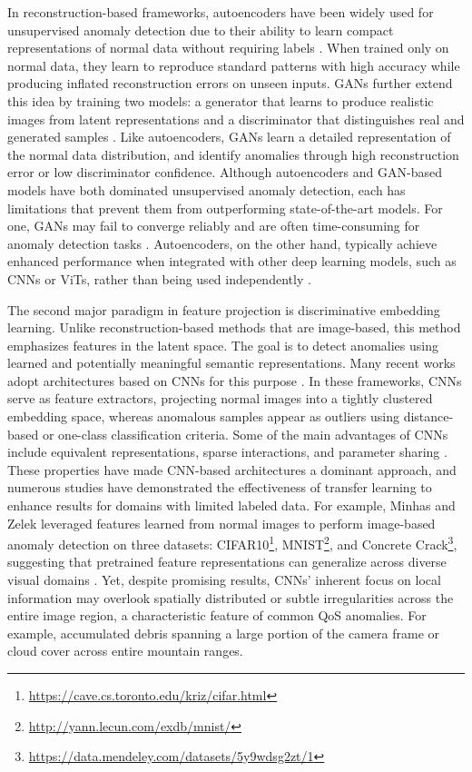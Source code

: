 \documentclass{article}
\begin{document}
In reconstruction-based frameworks, autoencoders have been widely used for unsupervised anomaly detection due to their ability to learn compact representations of normal data without requiring labels \cite{cheng2021improved, sakurada2014anomaly, ustek2024deep}. When trained only on normal data, they learn to reproduce standard patterns with high accuracy while producing inflated reconstruction errors on unseen inputs. \Ac{GANs} further extend this idea by training two models: a generator that learns to produce realistic images from latent representations and a discriminator that distinguishes real and generated samples \cite{Walczyna2025, xia2022gan}. Like autoencoders, \ac{GANs} learn a detailed representation of the normal data distribution, and identify anomalies through high reconstruction error or low discriminator confidence. Although autoencoders and GAN-based models have both dominated unsupervised anomaly detection, each has limitations that prevent them from outperforming state-of-the-art models. For one, \ac{GANs} may fail to converge reliably and are often time-consuming for anomaly detection tasks \cite{chen2022effectively}. Autoencoders, on the other hand, typically achieve enhanced performance when integrated with other deep learning models, such as \ac{CNNs} or \ac{ViT}s, rather than being used independently \cite{choi2022viv, lee2022anovit, yang2024unsupervised}.

The second major paradigm in feature projection is discriminative embedding learning. Unlike reconstruction-based methods that are image-based, this method emphasizes features in the latent space. The goal is to detect anomalies using learned and potentially meaningful semantic representations. Many recent works adopt architectures based on \ac{CNNs} for this purpose \cite{jain2024anomaly, minhas2019anomaly, zhou2016spatial}. In these frameworks, \ac{CNNs} serve as feature extractors, projecting normal images into a tightly clustered embedding space, whereas anomalous samples appear as outliers using distance-based or one-class classification criteria. Some of the main advantages of \ac{CNNs} include equivalent representations, sparse interactions, and parameter sharing \cite{alzubaidi2021review}. These properties have made CNN-based architectures a dominant approach, and numerous studies have demonstrated the effectiveness of transfer learning to enhance results for domains with limited labeled data. For example, Minhas and Zelek leveraged features learned from normal images to perform image-based anomaly detection on three datasets: CIFAR10\footnote{\url{https://cave.cs.toronto.edu/kriz/cifar.html}}, MNIST\footnote{\url{http://yann.lecun.com/exdb/mnist/}}, and Concrete Crack\footnote{\url{https://data.mendeley.com/datasets/5y9wdsg2zt/1}}, suggesting that pretrained feature representations can generalize across diverse visual domains \cite{minhas2019anomaly}. Yet, despite promising results, \ac{CNNs}' inherent focus on local information may overlook spatially distributed or subtle irregularities across the entire image region, a characteristic feature of common \ac{QoS} anomalies. For example, accumulated debris spanning a large portion of the camera frame or cloud cover across entire mountain ranges. 
\end{document}
